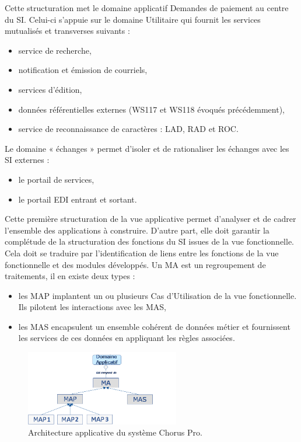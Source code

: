 \documentclass[12pt,a4paper]{article}
\begin{document}
\newpage
Cette structuration met le domaine applicatif Demandes de paiement au centre du \gls{SI}. Celui-ci s’appuie sur le domaine Utilitaire qui fournit les services mutualisés et transverses suivants :
\smallbreak
\begin{itemize}
\item	service de recherche,
\item	notification et émission de courriels,
\item	services d'édition,
\item	données référentielles externes (WS117 et WS118 évoqués précédemment),
\item	service de reconnaissance de caractères : \gls{LAD}, \gls{RAD} et \gls{ROC}.
\end{itemize}
\medbreak
Le domaine « échanges » permet d’isoler et de rationaliser les échanges avec les \gls{SI} externes :
\smallbreak
\begin{itemize}
\item	le portail de services,
\item	le portail \gls{EDI} entrant et sortant.
\end{itemize}
\medbreak
Cette première structuration de la vue applicative permet d’analyser et de cadrer l’ensemble des applications à construire. D’autre part, elle doit garantir la complétude de la structuration des fonctions du \gls{SI} issues de la vue fonctionnelle. Cela doit se traduire par l’identification de liens entre les fonctions de la vue fonctionnelle et des modules développés.
\smallbreak
Un \gls{MA} est un regroupement de traitements, il en existe deux types :
\begin{itemize}
\item les \gls{MAP} implantent un ou plusieurs Cas d’Utilisation de la vue fonctionnelle. Ils pilotent les interactions avec les \gls{MAS},
\item les MAS encapsulent un ensemble cohérent de données métier et fournissent les services de ces données en appliquant les règles associées.
\end{itemize}
\begin{figure}[H]
	\begin{center}
		\includegraphics[width=0.6\textwidth, keepaspectratio]{archiApplicative.png}
		\caption{Architecture applicative du système Chorus Pro.}
	\end{center}
\end{figure}
\clearpage
\newpage
\end{document}
